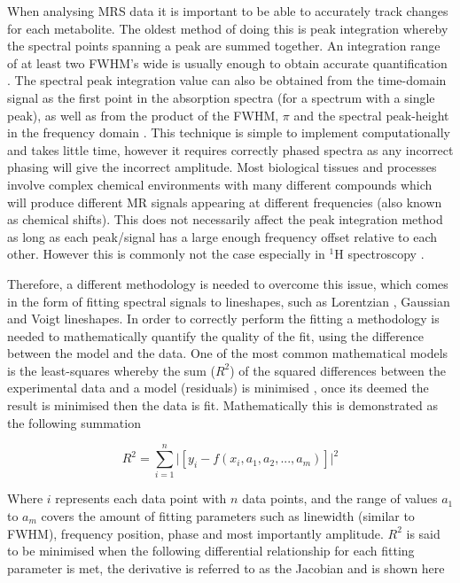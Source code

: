 When analysing \ac{MRS} data it is important to be able to accurately track changes for each metabolite. The oldest method of doing this is peak integration whereby the spectral points spanning a peak are summed together. An integration range of at least two \ac{FWHM}'s wide is usually enough to obtain accurate quantification \cite{Near2021PreprocessingRecommendations}. The spectral peak integration value can also be obtained from the time-domain signal as the first point in the absorption spectra (for a spectrum with a single peak), as well as from the product of the \ac{FWHM}, $\pi$ and the spectral peak-height in the frequency domain \cite{deGraaf2019InSpectroscopy}. This technique is simple to implement computationally and takes little time, however it requires correctly phased spectra as any incorrect phasing will give the incorrect amplitude. Most biological tissues and processes involve complex chemical environments with many different compounds which will produce different MR signals appearing at different frequencies (also known as chemical shifts). This does not necessarily affect the peak integration method as long as each peak/signal has a large enough frequency offset relative to each other. However this is commonly not the case especially in $^1$H spectroscopy \cite{Alger2010QuantitativeReview}. 

Therefore, a different methodology is needed to overcome this issue, which comes in the form of fitting spectral signals to lineshapes, such as Lorentzian \cite{Lorentz1895TheHeat}, Gaussian and Voigt \cite{Near2021PreprocessingRecommendations} lineshapes. In order to correctly perform the fitting a methodology is needed to mathematically quantify the quality of the fit, using the difference between the model and the data. One of the most common mathematical models is the least-squares \cite{Golub1973TheSeparate} whereby the sum ($R^2$) of the squared differences between the experimental data and a model (residuals) is minimised \cite{Vanhamme2001MRMethods}, once its deemed the result is minimised then the data is fit. Mathematically this is demonstrated as the following summation

\begin{equation}
    R^2 = \sum_{i=1}^{n} \big| [y_i - f(x_i,a_1,a_2,...,a_m)] \big|^2
    \label{eqn:theory:LS}
\end{equation}

\noindent Where $i$ represents each data point with $n$ data points, and the range of values $a_1$ to $a_m$ covers the amount of fitting parameters such as linewidth (similar to \ac{FWHM}), frequency position, phase and most importantly amplitude. $R^2$ is said to be minimised when the following differential relationship for each fitting parameter is met, the derivative is referred to as the Jacobian and is shown here

